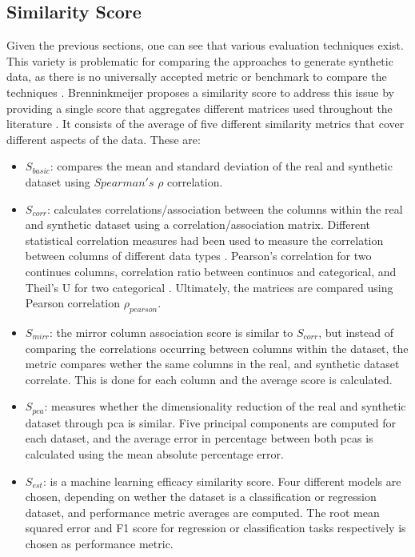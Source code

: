 \subsection{Similarity Score}
\label{ch:preliminaries-similarityScore}
Given the previous sections, one can see that various evaluation techniques exist.
This variety is problematic for comparing the approaches to generate synthetic data, as there is no universally accepted metric or benchmark to compare the techniques \cite{hernandez2022SyntheticDataGeneration, chundawat2022UniversalMetricRobust}.
Brenninkmeijer \etal proposes a similarity score to address this issue by providing a single score that aggregates different matrices used throughout the literature \cite{brenninkmeijer2019GenerationEvaluationTabular} . 
It consists of the average of five different similarity metrics that cover different aspects of the data. These are:
\begin{itemize}
  \item $S_{basic}$: compares the mean and standard deviation of the real and synthetic dataset using $Spearman's$ $\rho$ \cite{lane2003IntroductionStatistics} correlation.
  \item $S_{corr}$: calculates correlations/association between the columns within the real and synthetic dataset using a correlation/association matrix. 
  Different statistical correlation measures had been used to measure the correlation between columns of different data types \cite[p. 37]{brenninkmeijer2019GenerationEvaluationTabular}.
  Pearson's correlation for two continues columns, correlation ratio between continuos and categorical, and Theil's U for two categorical \cite{brenninkmeijer2019GenerationEvaluationTabular, lane2003IntroductionStatistics}.  
  Ultimately, the matrices are compared using Pearson correlation $\rho_{pearson}$.
  \item $S_{mirr}$: the mirror column association score is similar to $S_{corr}$, but instead of comparing the correlations occurring between columns within the dataset,
  the metric compares wether the same columns in the real, and synthetic dataset correlate.
  This is done for each column and the average score is calculated.
  \item $S_{pca}$: measures whether the dimensionality reduction of the real and synthetic dataset through \gls{pca} is similar.
  Five principal components are computed for each dataset, and the average error in percentage between both \glspl{pca} is calculated using the mean absolute percentage error.
  \item $S_{est}$: is a machine learning efficacy similarity score. Four different models are chosen, depending on wether the dataset is a classification or regression dataset, and performance metric averages are computed.
  The root mean squared error and F1 score for regression or classification tasks respectively is chosen as performance metric.
\end{itemize}


